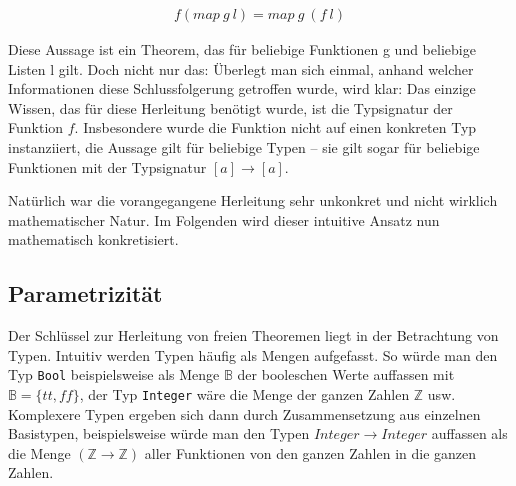 \begin{align*}
f (map\ g\ l) = map\ g\ (f\ l)
\end{align*}

Diese Aussage ist ein Theorem, das für beliebige Funktionen g und beliebige Listen l gilt. Doch nicht nur das: Überlegt man sich
einmal, anhand welcher Informationen diese Schlussfolgerung getroffen wurde, wird klar: Das einzige Wissen, das für diese Herleitung
benötigt wurde, ist die Typsignatur der Funktion $f$. Insbesondere wurde die Funktion nicht auf einen konkreten Typ instanziiert,
die Aussage gilt für beliebige Typen -- sie gilt sogar für beliebige Funktionen mit der Typsignatur $[a] \rightarrow [a]$.


Natürlich war die vorangegangene Herleitung sehr unkonkret und nicht wirklich mathematischer Natur. Im Folgenden wird dieser
intuitive Ansatz nun mathematisch konkretisiert.


\subsection{Parametrizität}

\label{sec:free-theorems-param}

Der Schlüssel zur Herleitung von freien Theoremen liegt in der Betrachtung von Typen.
Intuitiv werden Typen häufig als Mengen aufgefasst. So würde man den Typ \texttt{Bool} beispielsweise als Menge $\mathbb{B}$
der booleschen Werte auffassen mit $\mathbb{B} = \{ tt, ff \}$, der Typ \texttt{Integer} wäre die Menge der ganzen Zahlen
$\mathbb{Z}$ usw. Komplexere Typen ergeben sich dann durch Zusammensetzung aus einzelnen Basistypen, beispielsweise
würde man den Typen \texttt{$Integer \rightarrow Integer$} auffassen als die Menge $(\mathbb{Z} \rightarrow \mathbb{Z})$ aller Funktionen von den ganzen Zahlen in die ganzen Zahlen.

